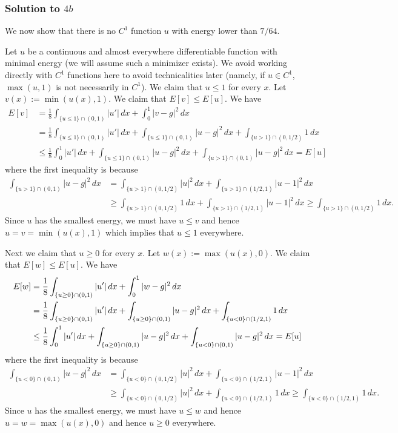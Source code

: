 \subsubsection*{Solution to $4b$}
We now show that there is no $C^{1}$ function $u$ with energy lower than $7/64$.

Let $u$ be a continuous and almost everywhere differentiable function with minimal energy (we will assume such a minimizer exists).
We avoid working directly with $C^{1}$ functions here to avoid technicalities later (namely, if $u \in C^{1}$, $\max(u, 1)$ is not necessarily in $C^{1}$).
We claim that $u \leq 1$ for every $x$. Let $v(x) := \min(u(x), 1)$. We claim that $E[v] \leq E[u]$. We have
\begin{align*}
E[v] &= \frac{1}{8}\int_{\{u \leq 1\}\cap (0, 1)}|u'|\, dx + \int_{0}^{1}|v - g|^{2}\, dx\\
& = \frac{1}{8}\int_{\{u \leq 1\} \cap (0, 1)}|u'|\, dx + \int_{\{u \leq 1\} \cap (0, 1)}|u - g|^{2}\, dx + \int_{\{u > 1\} \cap (0, 1/2)}1\, dx\\
&\leq \frac{1}{8}\int_{0}^{1}|u'|\, dx + \int_{\{u \leq 1\} \cap (0, 1)}|u - g|^{2}\, dx + \int_{\{u > 1\} \cap (0, 1)}|u - g|^{2}\, dx = E[u]
\end{align*}
where the first inequality is because
\begin{align*}
\int_{\{u > 1\} \cap (0, 1)}|u - g|^{2}\, dx &= \int_{\{u > 1\} \cap (0, 1/2)}|u|^{2}\, dx + \int_{\{u > 1\} \cap (1/2, 1)}|u - 1|^{2}\, dx\\
& \geq \int_{\{u > 1\} \cap (0, 1/2)}1\, dx + \int_{\{u > 1\} \cap (1/2, 1)}|u - 1|^{2}\, dx \geq \int_{\{u > 1\} \cap (0, 1/2)}1\, dx.
\end{align*}
Since $u$ has the smallest energy, we must have $u \leq v$ and hence $u = v = \min(u(x), 1)$ which implies
that $u \leq 1$ everywhere.

Next we claim that $u \geq 0$ for every $x$. Let $w(x) := \max(u(x), 0)$. We claim that $E[w] \leq E[u]$. We have
\begin{align*}
E[w] &= \frac{1}{8}\int_{\{u \geq 0\} \cap (0, 1)}|u'|\, dx + \int_{0}^{1}|w - g|^{2}\, dx\\
&= \frac{1}{8}\int_{\{u \geq 0\} \cap (0, 1)}|u'|\, dx + \int_{\{u \geq 0\} \cap (0, 1)}|u - g|^{2}\, dx + \int_{\{u < 0\} \cap (1/2, 1)}1\, dx\\
&\leq \frac{1}{8}\int_{0}^{1}|u'|\, dx + \int_{\{u \geq 0\} \cap (0, 1)}|u - g|^{2}\, dx + \int_{\{u < 0\} \cap (0, 1)}|u - g|^{2}\, dx = E[u]
\end{align*}
where the first inequality is because
\begin{align*}
\int_{\{u < 0\} \cap (0, 1)}|u - g|^{2}\, dx &= \int_{\{u < 0\} \cap (0, 1/2)}|u|^{2}\, dx + \int_{\{u < 0\} \cap (1/2, 1)}|u - 1|^{2}\, dx\\
&\geq  \int_{\{u < 0\} \cap (0, 1/2)}|u|^{2}\, dx + \int_{\{u < 0\} \cap (1/2, 1)}1\, dx \geq \int_{\{u < 0\} \cap (1/2, 1)}1\, dx.
\end{align*}
Since $u$ has the smallest energy, we must have $u \leq w$ and hence $u = w = \max(u(x) , 0)$ and hence $u \geq 0$ everywhere.

